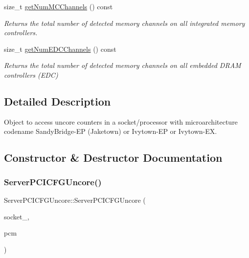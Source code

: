 \begin{DoxyCompactItemize}
\mbox{\label{class_server_p_c_i_c_f_g_uncore_ab59fb235a87be897547b1c32534d1a5f}} 
size\+\_\+t \mbox{\hyperlink{class_server_p_c_i_c_f_g_uncore_ab59fb235a87be897547b1c32534d1a5f}{get\+Num\+M\+C\+Channels}} () const
\begin{DoxyCompactList}\small\item\em Returns the total number of detected memory channels on all integrated memory controllers. \end{DoxyCompactList}\item 
\mbox{\label{class_server_p_c_i_c_f_g_uncore_abc8b36bca06eaa243b1013ae19374c2c}} 
size\+\_\+t \mbox{\hyperlink{class_server_p_c_i_c_f_g_uncore_abc8b36bca06eaa243b1013ae19374c2c}{get\+Num\+E\+D\+C\+Channels}} () const
\begin{DoxyCompactList}\small\item\em Returns the total number of detected memory channels on all embedded D\+R\+AM controllers (E\+DC) \end{DoxyCompactList}\end{DoxyCompactItemize}


\subsection{Detailed Description}
Object to access uncore counters in a socket/processor with microarchitecture codename Sandy\+Bridge-\/\+EP (Jaketown) or Ivytown-\/\+EP or Ivytown-\/\+EX. 

\subsection{Constructor \& Destructor Documentation}
\mbox{\label{class_server_p_c_i_c_f_g_uncore_a4e4176c31a041902805e16cc452016d3}} 
\subsubsection{\texorpdfstring{Server\+P\+C\+I\+C\+F\+G\+Uncore()}{ServerPCICFGUncore()}}
{\footnotesize\ttfamily Server\+P\+C\+I\+C\+F\+G\+Uncore\+::\+Server\+P\+C\+I\+C\+F\+G\+Uncore (\begin{DoxyParamCaption}\item[{uint32}]{socket\+\_\+,  }\item[{const \mbox{\hyperlink{class_p_c_m}{P\+CM}} $\ast$}]{pcm }\end{DoxyParamCaption})}



